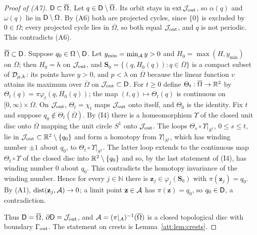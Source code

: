 \begin{proof}[Proof of (A7)]
\emph{$\mathsf D\subset\overline\Omega$.} Let $q\in\mathsf D\setminus\overline\Omega$. Its orbit stays in $\operatorname{ext}\mathcal J_{\rm out}$, so $\alpha(q)$ and $\omega(q)$ lie in $\mathsf D\setminus\Omega$. By (A6) both are projected cycles, since $\{0\}$ is excluded by $0\in\Omega$; every projected cycle lies in $\overline\Omega$, so both equal $\mathcal J_{\rm out}$, and $q$ is not periodic. This contradicts (A6).

\emph{$\overline\Omega\subset\mathsf D$.} Suppose $q_0\in\Omega\setminus\mathsf D$. Let $y_{\min}=\min_\mathcal A y>0$ and $H_0=\max(H,y_{\min})$ on $\overline\Omega$; then $H_0=h$ on $\mathcal J_{\rm out}$, and $\mathbf S_0=\{(q,H_0(q)):q\in\overline\Omega\}$ is a compact subset of $\mathcal D_{\mu,k}$: its points have $y>0$, and $p<\lambda$ on $\overline\Omega$ because the linear function $v$ attains its maximum over $\overline\Omega$ on $\mathcal J_{\rm out}\subset\mathsf D$. For $t\ge0$ define $\Theta_t:\overline\Omega\to\mathbb R^2$ by $\Theta_t(q)=\pi\varphi_t(q,H_0(q))$; the map $(t,q)\mapsto\Theta_t(q)$ is continuous on $[0,\infty)\times\overline\Omega$. On $\mathcal J_{\rm out}$, $\Theta_t=\chi_t$ maps $\mathcal J_{\rm out}$ onto itself, and $\Theta_0$ is the identity. Fix $t$ and suppose $q_0\notin\Theta_t(\overline\Omega)$. By (I4) there is a homeomorphism $\Upsilon$ of the closed unit disc onto $\overline\Omega$ mapping the unit circle $S^1$ onto $\mathcal J_{\rm out}$. The loops $\Theta_s\circ\Upsilon|_{S^1}$, $0\le s\le t$, lie in $\mathcal J_{\rm out}\subset\mathbb R^2\setminus\{q_0\}$ and form a homotopy from $\Upsilon|_{S^1}$, which has winding number $\pm1$ about $q_0$, to $\Theta_t\circ\Upsilon|_{S^1}$. The latter loop extends to the continuous map $\Theta_t\circ\Upsilon$ of the closed disc into $\mathbb R^2\setminus\{q_0\}$ and so, by the last statement of (I4), has winding number $0$ about $q_0$. This contradicts the homotopy invariance of the winding number. Hence for every $j\in\mathbb N$ there is $\mathbf z_j\in\varphi_j(\mathbf S_0)$ with $\pi(\mathbf z_j)=q_0$. By (A1), $\operatorname{dist}(\mathbf z_j,\mathcal A)\to0$; a limit point $\mathbf z\in\mathcal A$ has $\pi(\mathbf z)=q_0$, so $q_0\in\mathsf D$, a contradiction.

Thus $\mathsf D=\overline\Omega$, $\partial\mathsf D=\mathcal J_{\rm out}$, and $\mathcal A=(\pi|_\mathcal A)^{-1}(\overline\Omega)$ is a closed topological disc with boundary $\Gamma_{\rm out}$. The statement on crests is Lemma~\ref{att:lem:crests}.
\end{proof}

